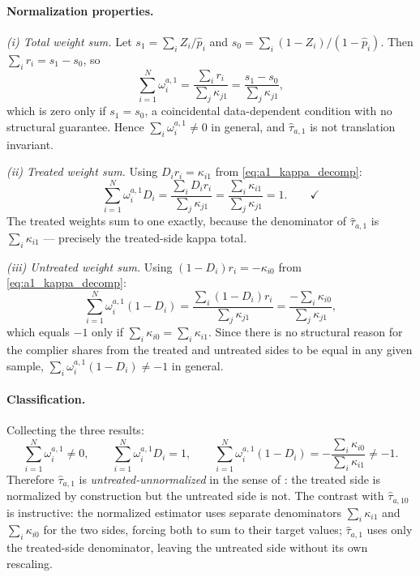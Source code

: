 \documentclass[12pt, a4paper, oneside]{article}
\theoremstyle{plain}
\theoremstyle{definition}
\begin{document}
\paragraph{Normalization properties.}

\noindent\textit{(i) Total weight sum.}
Let $s_1 = \sum_i Z_i/\hat{p}_i$ and $s_0 = \sum_i(1-Z_i)/(1-\hat{p}_i)$.
Then $\sum_i r_i = s_1 - s_0$, so
\begin{equation}
  \sum_{i=1}^N \omega_i^{a,1}
  = \frac{\sum_i r_i}{\sum_j\kappa_{j1}}
  = \frac{s_1 - s_0}{\sum_j\kappa_{j1}},
  \label{eq:a1_sum}
\end{equation}
which is zero only if $s_1 = s_0$, a coincidental data-dependent condition with no
structural guarantee. Hence $\sum_i\omega_i^{a,1} \neq 0$ in general, and
$\hat\tau_{a,1}$ is not translation invariant.

\noindent\textit{(ii) Treated weight sum.}
Using $D_i r_i = \kappa_{i1}$ from \eqref{eq:a1_kappa_decomp}:
\begin{equation}
  \sum_{i=1}^N \omega_i^{a,1} D_i
  = \frac{\sum_i D_i r_i}{\sum_j\kappa_{j1}}
  = \frac{\sum_i \kappa_{i1}}{\sum_j\kappa_{j1}}
  = 1. \qquad\checkmark
  \label{eq:a1_treated}
\end{equation}
The treated weights sum to one exactly, because the denominator of $\hat\tau_{a,1}$
is $\sum_i\kappa_{i1}$ — precisely the treated-side kappa total.

\noindent\textit{(iii) Untreated weight sum.}
Using $(1-D_i)r_i = -\kappa_{i0}$ from \eqref{eq:a1_kappa_decomp}:
\begin{equation}
  \sum_{i=1}^N \omega_i^{a,1}(1-D_i)
  = \frac{\sum_i (1-D_i) r_i}{\sum_j\kappa_{j1}}
  = \frac{-\sum_i \kappa_{i0}}{\sum_j\kappa_{j1}},
  \label{eq:a1_untreated}
\end{equation}
which equals $-1$ only if $\sum_i\kappa_{i0} = \sum_i\kappa_{i1}$. Since there is no
structural reason for the complier shares from the treated and untreated sides to be
equal in any given sample, $\sum_i\omega_i^{a,1}(1-D_i) \neq -1$ in general.

\paragraph{Classification.}
Collecting the three results:
\begin{equation}
  \sum_{i=1}^N \omega_i^{a,1} \neq 0,
  \qquad
  \sum_{i=1}^N \omega_i^{a,1} D_i = 1,
  \qquad
  \sum_{i=1}^N \omega_i^{a,1}(1-D_i) = -\frac{\sum_i\kappa_{i0}}{\sum_i\kappa_{i1}} \neq -1.
  \label{eq:a1_classification}
\end{equation}
Therefore $\hat\tau_{a,1}$ is \emph{untreated-unnormalized} in the sense of
\citet[Table~4]{knaus2024treatment}: the treated side is normalized by construction
but the untreated side is not. The contrast with $\hat\tau_{a,10}$ is instructive:
the normalized estimator uses separate denominators $\sum_i\kappa_{i1}$ and
$\sum_i\kappa_{i0}$ for the two sides, forcing both to sum to their target values;
$\hat\tau_{a,1}$ uses only the treated-side denominator, leaving the untreated side
without its own rescaling.
\end{document}

